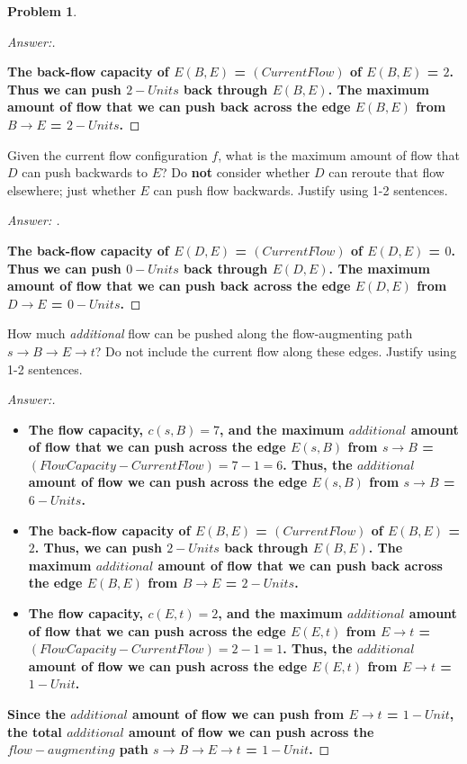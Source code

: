\documentclass[11pt]{article}
\theoremstyle{definition}
\theoremstyle{definition}
\newtheorem{required}{Problem}
\theoremstyle{definition}
\begin{document}
\begin{required}
\begin{enumerate}[label=(\alph*)]
\begin{proof}[Answer:] \
\item \textbf{The back-flow capacity of $E(B, E)$ = $(Current Flow)$ of $E(B, E)$ = $2$. Thus we can push $2-Units$ back through $E(B, E)$. The maximum amount of flow that we can push back across the edge $E(B, E)$ from $B \to E$ = \color{red}$2-Units$\color{black}.}
\end{proof}


\vskip 10pt
\item Given the current flow configuration $f$, what is the maximum amount of flow that $D$ can push backwards to $E$? Do \textbf{not} consider whether $D$ can reroute that flow elsewhere; just whether $E$ can push flow backwards. Justify using 1-2 sentences.

\begin{proof}[Answer: ] \
\item \textbf{The back-flow capacity of $E(D, E)$ = $(Current Flow)$ of $E(D, E)$ = $0$. Thus we can push $0-Units$ back through $E(D, E)$. The maximum amount of flow that we can push back across the edge $E(D, E)$ from $D \to E$ = \color{red}$0-Units$\color{black}.}
\end{proof}


\vskip 10pt
\item How much \textit{additional} flow can be pushed along the flow-augmenting path $s \to B \to E \to t$? Do not include the current flow along these edges. Justify using 1-2 sentences.

\begin{proof}[Answer:] \
\begin{itemize}
\item \textbf{The flow capacity, $c(s, B) = 7$, and the maximum $additional$ amount of flow that we can push across the edge  $E(s, B)$ from $s \to B$ = $(Flow Capacity - Current Flow) = 7 - 1 = 6$. Thus, the $additional$ amount of flow we can push across the edge $E(s, B)$ from $s \to B$ = $6-Units$.}
\item \textbf{The back-flow capacity of $E(B, E)$ = $(Current Flow)$ of $E(B, E)$ = $2$. Thus, we can push $2-Units$ back through $E(B, E)$. The maximum $additional$ amount of flow that we can push back across the edge $E(B, E)$ from $B \to E$ = $2-Units$.}
\item \textbf{The flow capacity, $c(E, t) = 2$, and the maximum $additional$ amount of flow that we can push across the edge  $E(E, t)$ from $E \to t$ = $(Flow Capacity - Current Flow) = 2 - 1 = 1$. Thus, the $additional$ amount of flow we can push across the edge $E(E, t)$ from $E \to t$ = $1-Unit$.}
\end{itemize}
\item \textbf{Since the $additional$ amount of flow we can push from $E \to t$ = $1-Unit$, the total $additional$ amount of flow we can push across the $flow-augmenting$ path $s \to B \to E \to t$ = \color{red}$1-Unit$\color{black}.}
\end{proof}



\end{enumerate}
\end{required}
\end{document}
